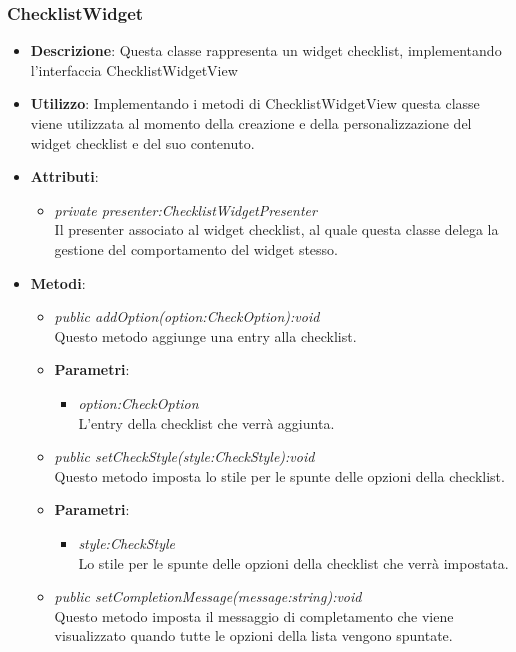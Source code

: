 \subsubsection{ChecklistWidget}
\begin{itemize}
\item \textbf{Descrizione}: Questa classe rappresenta un widget checklist, implementando l'interfaccia ChecklistWidgetView
\item \textbf{Utilizzo}: Implementando i metodi di ChecklistWidgetView questa classe viene utilizzata al momento della creazione e della personalizzazione del widget checklist e del suo contenuto.
\item \textbf{Attributi}:
	\begin{itemize}
	\item \textit{private presenter:ChecklistWidgetPresenter}\\
	Il presenter associato al widget checklist, al quale questa classe delega la gestione del comportamento del widget stesso.
	\end{itemize}
\item \textbf{Metodi}:
	\begin{itemize}
	\item \textit{public addOption(option:CheckOption):void}\\
	Questo metodo aggiunge una entry alla checklist.
		\item{\textbf{Parametri}: \begin{itemize}
		\item \textit{option:CheckOption}\\
		L'entry della checklist che verrà aggiunta.
		\end{itemize}}
	\item \textit{public setCheckStyle(style:CheckStyle):void}\\
	Questo metodo imposta lo stile per le spunte delle opzioni della checklist.
		\item{\textbf{Parametri}: \begin{itemize}
		\item \textit{style:CheckStyle}\\
		Lo stile per le spunte delle opzioni della checklist che verrà impostata.
		\end{itemize}} 
	\item \textit{public setCompletionMessage(message:string):void}\\
	Questo metodo imposta il messaggio di completamento che viene visualizzato quando tutte le opzioni della lista vengono spuntate.

\end{itemize}
\end{itemize}
